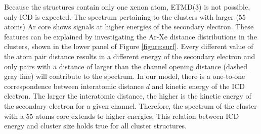 \documentclass[journal=jpccck,manuscript=article]{achemso}
\begin{document}
Because the structures contain only one xenon atom, ETMD(3) is not possible, only ICD is expected. 
The spectrum pertaining to the clusters with larger (55 atoms) Ar core shows
signals at higher energies of the secondary electron. These features
can be explained by investigating the Ar-Xe distance distributions
in the clusters, shown
in the lower panel of Figure \ref{figure:surf}. 
Every different value of the atom pair distance
results in a different energy of the secondary electron and only pairs
with a distance of larger than the channel opening distance
(dashed gray line) will contribute
to the spectrum. 
In our model, there is a one-to-one correspondence between interatomic distance $d$ and kinetic energy of the ICD electron.
The larger the interatomic distance, the higher is the
kinetic energy of the secondary electron for a given channel.
Therefore, the spectrum of the cluster with a 55 atoms core extends to higher energies.
This relation between ICD energy and cluster size holds true for all cluster structures.
\end{document}
